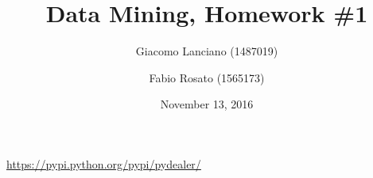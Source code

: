 \documentclass{article}
\title{Data Mining, Homework \#1}
\author{Giacomo Lanciano (1487019) \and Fabio Rosato (1565173)}
\date{November 13, 2016}
\begin{document}
\maketitle
\tableofcontents

\newpage


\newpage


\newpage


\newpage


\newpage
\begin{thebibliography}{9}
	
	\url{https://pypi.python.org/pypi/pydealer/}
	
\end{thebibliography}
\end{document}
